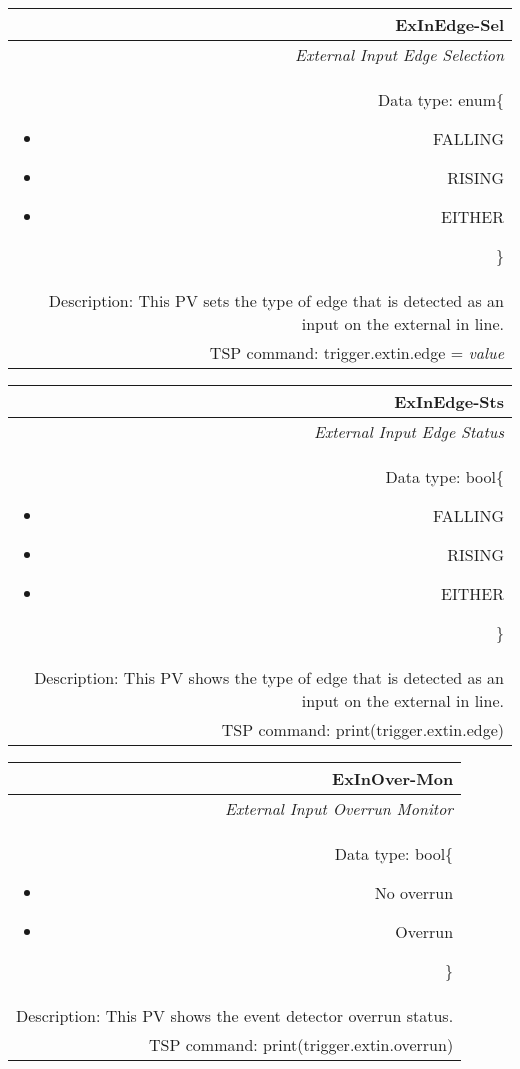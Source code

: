 \documentclass[openany]{article}
\begin{document}
		\begin{tabular}{N}
			\hline
			\bfseries ExInEdge-Sel\label{pv:exinedge-sel} \\ \hline
			\emph{External Input Edge Selection} \\
			Data type: enum\{\begin{itemize}[noitemsep]
				\small
				\item[] FALLING
				\item[] RISING
				\item[] EITHER
			\end{itemize}\} \\
			Description: This PV sets the type of edge that is detected as an input on the external in line. \\
			TSP command: trigger.extin.edge = \emph{value}
		\end{tabular}

		\begin{tabular}{N}
			\hline
			\bfseries ExInEdge-Sts\label{pv:exinedge-sts} \\ \hline
			\emph{External Input Edge Status} \\
			Data type: bool\{\begin{itemize}[noitemsep]
				\small
				\item[] FALLING
				\item[] RISING
				\item[] EITHER
			\end{itemize}\} \\
			Description: This PV shows the type of edge that is detected as an input on the external in line. \\
			TSP command: print(trigger.extin.edge)
		\end{tabular}

		\begin{tabular}{N}
			\hline
			\bfseries ExInOver-Mon\label{pv:exinover-mon} \\ \hline
			\emph{External Input Overrun Monitor} \\
			Data type: bool\{\begin{itemize}[noitemsep]
				\small
				\item[] No overrun
				\item[] Overrun
			\end{itemize}\} \\
			Description: This PV shows the event detector overrun status. \\
			TSP command: print(trigger.extin.overrun)
		\end{tabular}
\end{document}
